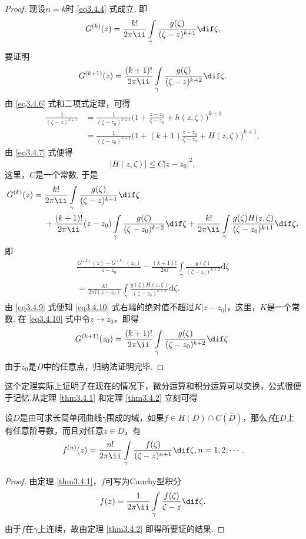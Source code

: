 \begin{proof}
现设$n=k$时 \eqref{eq3.4.4} 式成立. 即
\[ G^{(k)}(z)=\frac{k!}{2\pi\ii}\int\limits_\gamma\frac{g(\zeta)}{(\zeta-z)^{k+1}}\dif \zeta,
\]
要证明
\[ G^{(k+1)}(z)=\frac{(k+1)!}{2\pi\ii}\int\limits_\gamma\frac{g(\zeta)}{(\zeta-z)^{k+2}}\dif \zeta.
\]
由 \eqref{eq3.4.6} 式和二项式定理，可得
\begin{align*}
\frac{1}{( \zeta -z) ^{k+1}}&=\frac{1}{( \zeta -z_0 ) ^{k+1}}\bigg( 1+\frac{z-z_0}{\zeta -z_0}+h( z,\zeta ) \bigg) ^{k+1}\\
&=\frac{1}{( \zeta -z_0 ) ^{k+1}}\bigg( 1+(k+1)\frac{z-z_0}{\zeta -z_0}+H( z,\zeta ) \bigg) ^{k+1},
\end{align*}
由 \eqref{eq3.4.7} 式便得
\begin{equation}\label{eq3.4.9}
  |H(z,\zeta)|\le C|z-z_0|^2,
\end{equation}
这里，$C$是一个常数. 于是
\begin{align*}
G^{(k)}(z)={}&\frac{k!}{2\pi\ii}\int\limits_\gamma\frac{g(\zeta)}{(\zeta-z)^{k+1}}\dif \zeta\\
&+\frac{(k+1)!}{2\pi\ii}(z-z_0)\int\limits_\gamma\frac{g(\zeta)}{(\zeta-z_0)^{k+2}}
\dif \zeta+\frac{k!}{2\pi\ii}\int\limits_\gamma\frac{g(\zeta)H(z,\zeta)}{(\zeta-z_0)^{k+1}}
\dif \zeta,
\end{align*}
即
\begin{equation}\label{eq3.4.10}
\begin{gathered}
  \frac{G^{( k )}( z ) -G^{( k )}( z_0 )}{z-z_0}-\frac{( k+1 ) !}{2\pi\ii}\int\limits_{\gamma}{\frac{g( \zeta )}{( \zeta -z_0 ) ^{k+2}}\text{d}\zeta}\\
  =\frac{k!}{2\pi\ii ( z-z_0 )}\int\limits_{\gamma}{\frac{g( \zeta ) H( z,\zeta )}{( \zeta -z_0 ) ^{k+1}}\text{d}\zeta}.
\end{gathered}
\end{equation}
由 \eqref{eq3.4.9} 式便知 \eqref{eq3.4.10} 式右端的绝对值不超过$K|z-z_0|$，这里，$K$是一个常数. 在 \eqref{eq3.4.10} 式中令$z\to z_0$，即得
\[ G^{(k+1)}(z_0)=\frac{(k+1)!}{2\pi\ii}\int\limits_\gamma\frac{g(\zeta)}{(\zeta-z_0)^{k+2}}\dif \zeta.
\]
由于$z_0$是$D$中的任意点，归纳法证明完毕.
\end{proof}

这个定理实际上证明了在现在的情况下，微分运算和积分运算可以交换，公式很便于记忆.从定理 \ref{thm3.4.1} 和定理 \ref{thm3.4.2} 立刻可得
\begin{theorem}\label{thm3.4.3}
设$D$是由可求长简单闭曲线$\gamma$围成的域，如果$f\in H(D)\cap C(\bar D)$，那么$f$在$D$上有任意阶导数，而且对任意$z\in D$，有
\begin{equation*}
  f^{(n)}(z)=\frac{n!}{2\pi\ii}\int\limits_\gamma\frac{f(\zeta)}{(\zeta-z)^{n+1}}\dif \zeta,n=1,2,\cdots.
\end{equation*}
\end{theorem}
\begin{proof}
由定理 \ref{thm3.4.1}，$f$可写为Cauchy型积分
\[f(z)=\frac1{2\pi\ii}\int\limits_{\gamma}\frac{f(\zeta)}{\zeta-z}\dif \zeta.\]
由于$f$在$\gamma$上连续，故由定理 \ref{thm3.4.2} 即得所要证的结果.
\end{proof}

